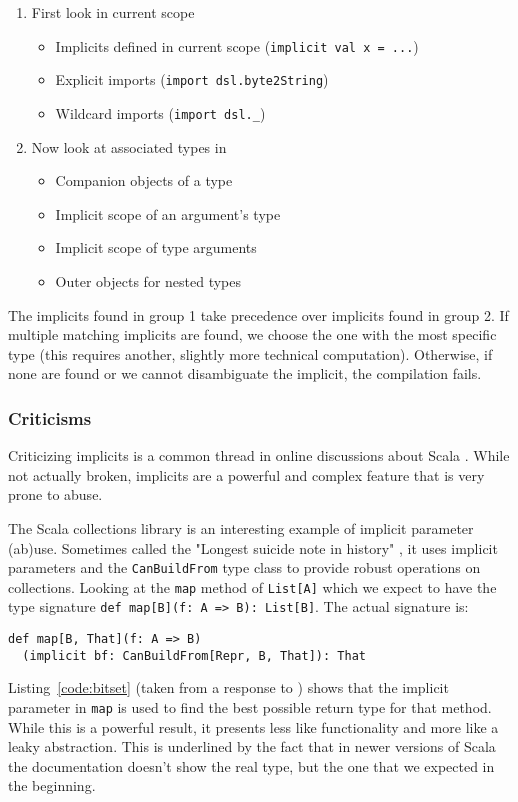 \begin{enumerate}
	\item First look in current scope
	\begin{itemize}
		\item Implicits defined in current scope (\texttt{implicit val x = ...})
    \item Explicit imports (\texttt{import dsl.byte2String})
    \item Wildcard imports (\texttt{import dsl.\_})
	\end{itemize}
	\item Now look at associated types in
	\begin{itemize}
		\item Companion objects of a type
		\item Implicit scope of an argument’s type
		\item Implicit scope of type arguments
		\item Outer objects for nested types
	\end{itemize}
\end{enumerate}

The implicits found in group 1 take precedence over implicits found in group 2.
If multiple matching implicits are found, we choose the one with the most specific type (this requires another, slightly more technical computation).
Otherwise, if none are found or we cannot disambiguate the implicit, the compilation fails.

\subsubsection{Criticisms}

Criticizing implicits is a common thread in online discussions about Scala \autocite{Plush:2015, lakes:2009, Allan:2013, Hale:2011}.
While not actually broken, implicits are a powerful and complex feature that is very prone to abuse.

The Scala collections library is an interesting example of implicit parameter (ab)use.
Sometimes called the "Longest suicide note in history" \autocite{lakes:2009}, it uses implicit parameters and the \texttt{CanBuildFrom} type class to provide robust operations on collections.
Looking at the \texttt{map} method of \texttt{List[A]} which we expect to have the type signature \texttt{def map[B](f: A => B): List[B]}.
The actual signature is:
\begin{verbatim}
def map[B, That](f: A => B)
  (implicit bf: CanBuildFrom[Repr, B, That]): That
\end{verbatim}
Listing~\ref{code:bitset} (taken from a response to \autocite{lakes:2009}) shows that the implicit parameter in \texttt{map} is used to find the best possible return type for that method.
While this is a powerful result, it presents less like functionality and more like a leaky abstraction.
This is underlined by the fact that in newer versions of Scala the documentation doesn't show the real type, but the one that we expected in the beginning.

